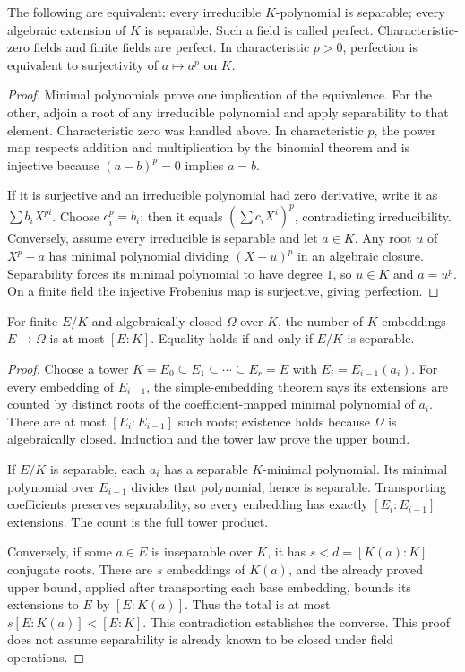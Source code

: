 \begin{theorem}
The following are equivalent: every irreducible $K$-polynomial is separable; every algebraic extension of $K$ is separable. Such a field is called perfect. Characteristic-zero fields and finite fields are perfect. In characteristic $p>0$, perfection is equivalent to surjectivity of $a\mapsto a^p$ on $K$.
\end{theorem}
\begin{proof}
Minimal polynomials prove one implication of the equivalence. For the other, adjoin a root of any irreducible polynomial and apply separability to that element. Characteristic zero was handled above. In characteristic $p$, the power map respects addition and multiplication by the binomial theorem and is injective because $(a-b)^p=0$ implies $a=b$.

If it is surjective and an irreducible polynomial had zero derivative, write it as $\sum b_i X^{pi}$. Choose $c_i^p=b_i$; then it equals $(\sum c_i X^i)^p$, contradicting irreducibility. Conversely, assume every irreducible is separable and let $a\in K$. Any root $u$ of $X^p-a$ has minimal polynomial dividing $(X-u)^p$ in an algebraic closure. Separability forces its minimal polynomial to have degree $1$, so $u\in K$ and $a=u^p$. On a finite field the injective Frobenius map is surjective, giving perfection.
\end{proof}

\begin{theorem}\label{thm:embedding-count}
For finite $E/K$ and algebraically closed $\Omega$ over $K$, the number of $K$-embeddings $E\to\Omega$ is at most $[E:K]$. Equality holds if and only if $E/K$ is separable.
\end{theorem}
\begin{proof}
Choose a tower $K=E_0\subseteq E_1\subseteq\cdots\subseteq E_r=E$ with $E_i=E_{i-1}(a_i)$. For every embedding of $E_{i-1}$, the simple-embedding theorem says its extensions are counted by distinct roots of the coefficient-mapped minimal polynomial of $a_i$. There are at most $[E_i:E_{i-1}]$ such roots; existence holds because $\Omega$ is algebraically closed. Induction and the tower law prove the upper bound.

If $E/K$ is separable, each $a_i$ has a separable $K$-minimal polynomial. Its minimal polynomial over $E_{i-1}$ divides that polynomial, hence is separable. Transporting coefficients preserves separability, so every embedding has exactly $[E_i:E_{i-1}]$ extensions. The count is the full tower product.

Conversely, if some $a\in E$ is inseparable over $K$, it has $s<d=[K(a):K]$ conjugate roots. There are $s$ embeddings of $K(a)$, and the already proved upper bound, applied after transporting each base embedding, bounds its extensions to $E$ by $[E:K(a)]$. Thus the total is at most $s[E:K(a)]<[E:K]$. This contradiction establishes the converse. This proof does not assume separability is already known to be closed under field operations.
\end{proof}

